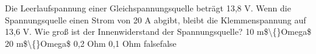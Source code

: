     {Die Leerlaufspannung einer Gleichspannungsquelle beträgt 13,8 V. Wenn die Spannungsquelle einen Strom von 20 A abgibt, bleibt die Klemmenspannung auf 13,6 V. Wie groß ist der Innenwiderstand der Spannungsquelle?}
    {10 m\$\textbackslash\{\}Omega\$}
    {20 m\$\textbackslash\{\}Omega\$}
    {0,2 Ohm}
    {0,1 Ohm}
    {false}{false}